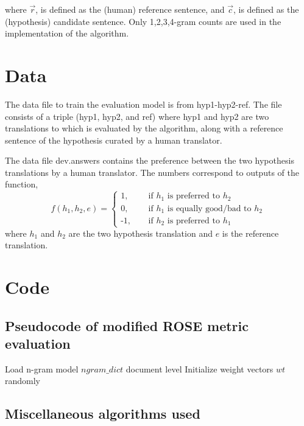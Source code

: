 \documentclass[11pt,letterpaper]{article}
\begin{document}
where $\vec{r}$, is defined as the (human) reference sentence, and $\vec{c}$, is defined as the (hypothesis) candidate sentence. Only 1,2,3,4-gram counts are used in the implementation of the algorithm.

\section{Data}

The data file to train the evaluation model is from hyp1-hyp2-ref. The file consists of a triple (hyp1, hyp2, and ref) where hyp1 and hyp2 are two translations to which is evaluated by the algorithm, along with a reference sentence of the hypothesis curated by a human translator.

The data file dev.answers contains the preference between the two hypothesis translations by a human translator. The numbers correspond to outputs of the function,
	\[ f(h_{1}, h_{2}, e) = 
		\begin{cases}
			\text{1, } &\quad\text{if $h_{1}$ is preferred to $h_{2}$}\\
			\text{0, } &\quad\text{if $h_{1}$ is equally good/bad to $h_{2}$}\\
			\text{-1, } &\quad\text{if $h_{2}$ is preferred to $h_{1}$ }
		\end{cases} \]
where $h_{1}$ and $h_{2}$ are the two hypothesis translation and $e$ is the reference translation.

\section{Code}
\subsection{Pseudocode of modified ROSE metric evaluation}
\begin{algorithm}
	Load n-gram model $ngram\_dict$ document level\;
	Initialize weight vectors $wt$ randomly\;
\end{algorithm}
\subsection{Miscellaneous algorithms used}
\end{document}
